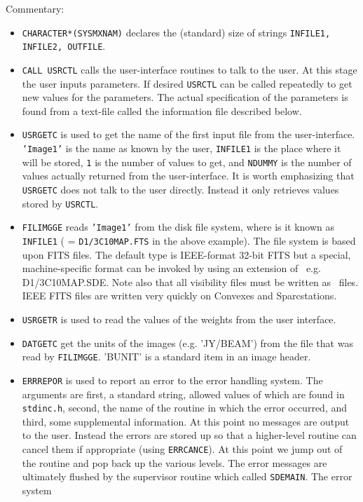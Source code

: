 Commentary:
\begin{itemize}
\item {\tt CHARACTER*(SYSMXNAM)} declares the (standard) size of
strings {\tt INFILE1, INFILE2, OUTFILE}.
\item {\tt CALL USRCTL} calls the user-interface routines to
talk to the user. At this stage the user inputs parameters.
If desired {\tt USRCTL} can be called repeatedly to get new values
for the parameters. The actual specification of the parameters is found
from a text-file called the information file described below.
\item {\tt USRGETC} is used to get the name of the first input file
from the user-interface. {\tt 'Image1'} is the name as known by the
user, {\tt INFILE1} is the place where it will be stored, {\tt 1}
is the number of values to get, and {\tt NDUMMY} is the number of
values actually returned from the user-interface. It is worth emphasizing 
that {\tt USRGETC} does not talk to the user directly. Instead it only 
retrieves values stored by {\tt USRCTL}.
\item {\tt FILIMGGE} reads {\tt 'Image1'} from the disk file system,
where is it known as {\tt INFILE1} ( = {\tt D1/3C10MAP.FTS} in the
above example). The file system is based upon FITS files. The default
type is IEEE-format 32-bit FITS but a special, machine-specific format
can be invoked by using an extension of \sde\ e.g. {D1/3C10MAP.SDE}.
Note also that all visibility files must be written as \sde\ files.
IEEE FITS files are written very quickly on Convexes and Sparcstations.
\item {\tt USRGETR} is used to read the values of the weights from the user
interface.
\item {\tt DATGETC} get the units of the images (e.g. 'JY/BEAM') from
the file that was read by {\tt FILIMGGE}.
'BUNIT' is a standard item in an image header.
\item {\tt ERRREPOR} is used to report an error to the error handling
system. The arguments are first, a standard string, allowed values of
which are found in {\tt stdinc.h}, second, the name of the routine in which
the error occurred, and third, some supplemental information. At this point
no messages are output to the user. Instead the errors are stored up so
that a higher-level routine can cancel them if appropriate (using 
{\tt ERRCANCE}). At this point we jump out of the routine and pop
back up the various levels. The error messages are ultimately flushed
by the supervisor routine which called {\tt SDEMAIN}. The error system

\end{itemize}
